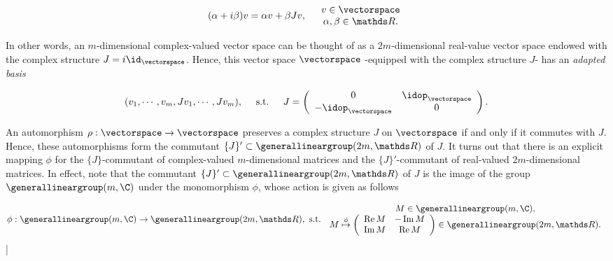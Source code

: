 \documentclass{homework}
\begin{document}
\begin{equation}
    (\alpha + i\beta) v = \alpha v + \beta J v, \quad \begin{array}{cc}
         v \in \vectorspace  \\
         \alpha, \beta \in \R.
    \end{array}
\end{equation}

In other words, an $m$-dimensional complex-valued vector space can be thought of as a $2m$-dimensional real-value vector space endowed with the complex structure $J = i\id_{\vectorspace}$. 
Hence, this vector space $\vectorspace$ -equipped with the complex structure $J$- has an \textit{adapted basis}

\begin{equation}
    (v_1, \cdots, v_m, Jv_1, \cdots, J v_m), \quad \textnormal{ s.t. } \quad J = \left(
        \begin{array}{cc}
            0 & \idop_\vectorspace  \\
           - \idop_\vectorspace & 0
        \end{array}
    \right).
\end{equation}

\medbreak

An automorphism $\rho: \vectorspace \rightarrow \vectorspace$ preserves a complex structure $J$ on $\vectorspace$ if and only if it commutes with $J$. Hence, these automorphisms form the commutant $\{J\}' \subset \generallineargroup(2m, \R)$ of $J$. It turns out that there is an explicit mapping $\phi$ for the $\{J\}$-commutant of complex-valued $m$-dimensional matrices and the $\{J\}'$-commutant of real-valued $2m$-dimensional matrices. In effect, note that the commutant $\{J\}' \subset \generallineargroup(2m, \R)$ of $J$ is the image of the group $\generallineargroup(m,\C)$ under the monomorphism $\phi$, whose action is given as follows 

\begin{equation}
    \begin{split}
    \phi: \generallineargroup(m,\C) \rightarrow \generallineargroup(2m,\R), \textnormal{ s.t. }
    \begin{array}{cc}
         M \in \generallineargroup(m,\C), \\
         M \overset{\phi}{ \mapsto} 
        \left(
            \begin{array}{cc}
                \Re M & -\Im M  \\
                \Im M & \Re M
            \end{array}
        \right) \in \generallineargroup(2m, \R).
    \end{array}
    \end{split}
\end{equation}|
\end{document}
